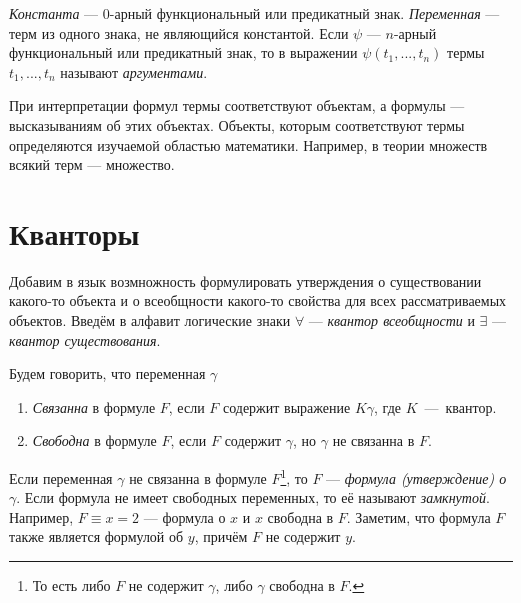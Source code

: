 {\it Константа} --- $0$-арный функциональный или предикатный знак.
{\it Переменная} --- терм из одного знака,
не являющийся константой.
Если $\psi$ --- $n$-арный функциональный или предикатный знак, то в выражении
$\psi(t_1,...,t_{n})$ термы $t_1,...,t_{n}$ называют {\it аргументами}.

При интерпретации формул термы соответствуют объектам, а формулы --- высказываниям
об этих объектах. Объекты, которым соответствуют термы определяются изучаемой
областью математики. Например, в теории множеств всякий терм --- множество.

\section{Кванторы}

Добавим в язык возмножность формулировать утверждения о существовании
какого-то объекта и о всеобщности какого-то свойства для всех рассматриваемых объектов.
Введём в алфавит логические знаки $\forall$
--- {\it квантор всеобщности} и $\exists$
--- {\it квантор существования}.

\pagebreak

Будем говорить, что переменная $\gamma$
\begin{multicols}{2}
	\begin{enumerate}
		\item{}{\it Связанна}
		в формуле $F$, если $F$ содержит
		выражение $K\gamma$, где $K$~---~квантор.
		\columnbreak
		\item{}{\it Свободна}
		в формуле $F$, если $F$ содержит $\gamma$,
		но $\gamma$ не связанна в $F$.
	\end{enumerate}
\end{multicols}

Если переменная $\gamma$
не связанна в формуле $F$\footnote{
	То есть либо $F$ не содержит $\gamma$, либо $\gamma$ свободна в $F$.},
то $F$ --- {\it формула (утверждение) о}
$\gamma$. Если формула не имеет
свободных переменных, то её называют {\it замкнутой}.
Например, $F\equiv x=2$ --- формула о $x$ и $x$ свободна в $F$.
Заметим, что формула $F$ также является формулой об $y$, причём $F$ не содержит $y$.

